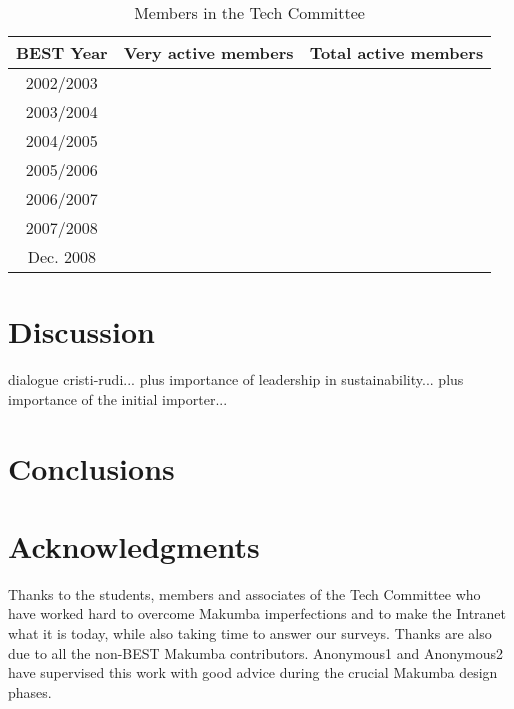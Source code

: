 \documentclass{acm_proc_article-sp}
\begin{document}
\begin{table}\label{tab:itd-members}
	\centering
	\caption{Members in the Tech Committee}
	\begin{tabular}{c|r|r}
		\hline
		\hline
		BEST Year 		& Very active members 	& Total active members 	\\
		\hline
		\hline
		2002/2003		& 						&  \\
		\hline
		2003/2004		& 						&  \\
		\hline
		2004/2005		& 						&  \\
		\hline
		2005/2006		& 						&  \\
		\hline
		2006/2007		& 						&  \\
		\hline
		2007/2008		& 						&  \\
		\hline
		Dec. 2008		& 						&  \\
		\hline
		\hline
	\end{tabular}
\end{table} 

\section{Discussion}\label{sec:disco}
dialogue cristi-rudi... plus importance of leadership in sustainability... plus importance of the initial importer...


\section{Conclusions}\label{sec:conclusions}

\section{Acknowledgments}\label{sec:acknowledgments}
Thanks to the students, members and associates of the Tech Committee who have worked hard to overcome Makumba imperfections and to make the Intranet what it is today, while also taking time to answer our surveys.  Thanks are also due to all the non-BEST Makumba contributors.  Anonymous1 and Anonymous2 have supervised this work with good advice during the crucial Makumba design phases.

%

 

%

\balancecolumns
\end{document}
